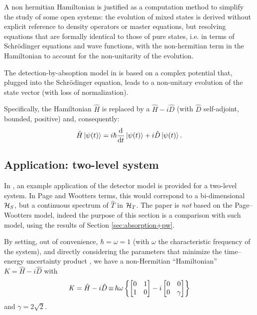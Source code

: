 A non hermitian Hamiltonian is justified as a computation method
to simplify the study of some open systems: the evolution of mixed
states is derived without explicit reference to density operators
or master equations, but resolving equations that are formally
identical to those of pure states,
i.e. in terms of
Schr{\"o}dinger equations and wave functions,
with the non-hermitian term in the Hamiltonian
to account for the non-unitarity of the evolution.

The detection-by-absoption model in \cite{RuschhauptAbsorption}
is based on a complex potential that, plugged into the Schr\"odinger equation,
leads to a non-unitary evolution of the state vector
(with loss of normalization).

Specifically, the Hamiltonian $\hat{H}$ is replaced by a $\hat{H} - i\hat{D}$
(with $\hat{D}$ self-adjoint, bounded, positive)
and, consequently:
\begin{equation}\label{eq:schrod_complex_pot}
  \hat{H} \ket{\psi(t)} = i\hbar\dv{t}\ket{\psi(t)} +i\hat{D}\ket{\psi(t)} \text{.}
\end{equation}

\citereset\subsection{Application: two-level system}

In \cite{RuschhauptAbsorption}, an example application of the detector model
is provided for a two-level system.
In Page and Wootters terms,
this would corrspond to a bi-dimensional $\mathcal{H}_S$, but a continuous
spectrum of $\hat{T}$ in $\mathcal{H}_T$. The paper is \emph{not} based on
the Page--Wootters model, indeed the purpose of this section is a comparison
with such model, using the results of Section \ref{sec:absorption+pw}.

By setting, out of convenience, $\hbar = \omega = 1$
(with $\omega$ the characteristic frequency of the system),
and directly considering the parameters
that minimize the time--energy uncertainty product \parencite{RuschhauptAbsorption},
we have a non-Hermitian ``Hamiltonian''
$\mathit{K} = \hat{H} - i\hat{D}$ with
\begin{equation}\label{eq:complexpot}
  \mathit{K} = \hat{H} - i\hat{D} \operatorname*{\equiv}
    \hbar\omega\left\{
      \left[\begin{matrix}0 & 1\\1 & 0\end{matrix}\right] -
      i \left[\begin{matrix}0 & 0\\0 & \gamma \end{matrix}\right]
    \right\}
\end{equation}
and $\gamma = 2\sqrt{2}$.

